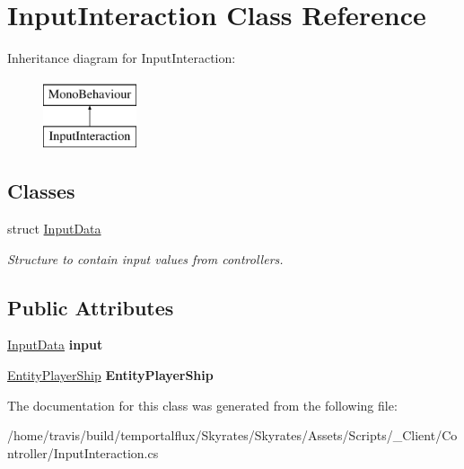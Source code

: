 \hypertarget{class_input_interaction}{\section{Input\-Interaction Class Reference}
\label{class_input_interaction}
}
Inheritance diagram for Input\-Interaction\-:\begin{figure}[H]
\begin{center}
\leavevmode
\includegraphics[height=2.000000cm]{class_input_interaction}
\end{center}
\end{figure}
\subsection*{Classes}
\begin{DoxyCompactItemize}
\item 
struct \hyperlink{struct_input_interaction_1_1_input_data}{Input\-Data}
\begin{DoxyCompactList}\small\item\em Structure to contain input values from controllers. \end{DoxyCompactList}\end{DoxyCompactItemize}
\subsection*{Public Attributes}
\begin{DoxyCompactItemize}
\item 
\hypertarget{class_input_interaction_a65feda331718482c2c867a0b05b4414e}{\hyperlink{struct_input_interaction_1_1_input_data}{Input\-Data} {\bfseries input}}\label{class_input_interaction_a65feda331718482c2c867a0b05b4414e}

\item 
\hypertarget{class_input_interaction_a94a199f25f8c5499bd8ce958164dc059}{\hyperlink{class_skyrates_1_1_client_1_1_entity_1_1_entity_player_ship}{Entity\-Player\-Ship} {\bfseries Entity\-Player\-Ship}}\label{class_input_interaction_a94a199f25f8c5499bd8ce958164dc059}

\end{DoxyCompactItemize}


The documentation for this class was generated from the following file\-:\begin{DoxyCompactItemize}
\item 
/home/travis/build/temportalflux/\-Skyrates/\-Skyrates/\-Assets/\-Scripts/\-\_\-\-Client/\-Controller/Input\-Interaction.\-cs\end{DoxyCompactItemize}
